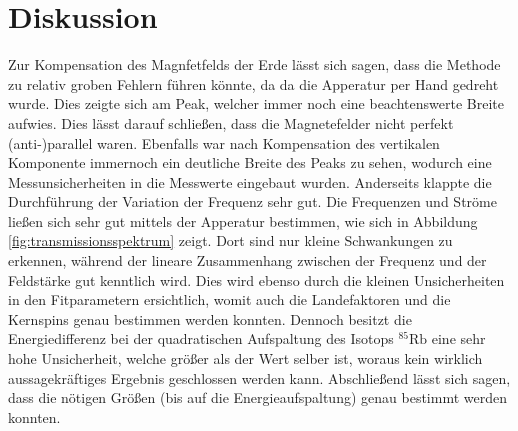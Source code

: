 \section{Diskussion}
\label{sec:Diskussion}
Zur Kompensation des Magnfetfelds der Erde lässt sich sagen, dass die Methode zu relativ groben Fehlern führen könnte, da 
da die Apperatur per Hand gedreht wurde.
Dies zeigte sich am Peak, welcher immer noch eine beachtenswerte Breite aufwies.
Dies lässt darauf schließen, dass die Magnetefelder nicht perfekt (anti-)parallel waren.
Ebenfalls war nach Kompensation des vertikalen Komponente immernoch ein deutliche Breite des Peaks zu sehen, wodurch eine
Messunsicherheiten in die Messwerte eingebaut wurden.
Anderseits klappte die Durchführung der Variation der Frequenz sehr gut.
Die Frequenzen und Ströme ließen sich sehr gut mittels der Apperatur bestimmen, wie sich in Abbildung \ref{fig:transmissionsspektrum} zeigt.
Dort sind nur kleine Schwankungen zu erkennen, während der lineare Zusammenhang zwischen der Frequenz und der Feldstärke gut kenntlich wird.
Dies wird ebenso durch die kleinen Unsicherheiten in den Fitparametern ersichtlich, womit auch die Landefaktoren und die Kernspins 
genau bestimmen werden konnten.
Dennoch besitzt die Energiedifferenz bei der quadratischen Aufspaltung des Isotops $^85\text{Rb}$ eine sehr hohe Unsicherheit, welche größer 
als der Wert selber ist, woraus kein wirklich aussagekräftiges Ergebnis geschlossen werden kann.
Abschließend lässt sich sagen, dass die nötigen Größen (bis auf die Energieaufspaltung) genau bestimmt werden konnten.